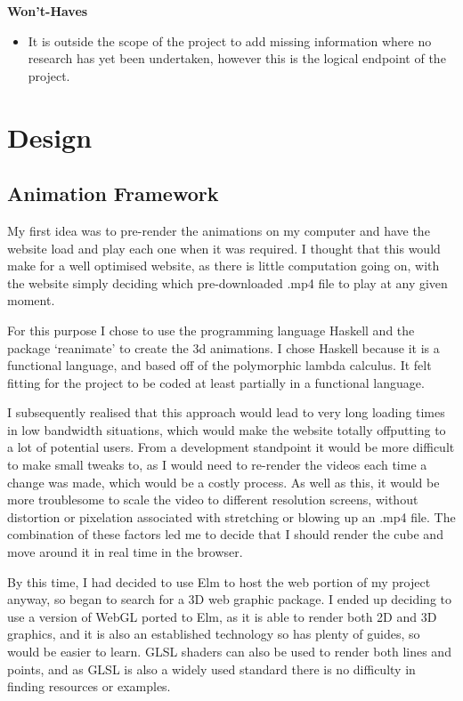 \documentclass{l4proj}
\begin{document}
\textbf{Won't-Haves}

\begin{itemize}
    \item It is outside the scope of the project to add missing information where no research has yet been undertaken, however this is the logical endpoint of the project.
\end{itemize}


\chapter{Design}

\section{Animation Framework}

My first idea was to pre-render the animations on my computer and have the website load and play each one when it was required.  I thought that this would make for a well optimised website, as there is little computation going on, with the website simply deciding which pre-downloaded .mp4 file to play at any given moment. 

For this purpose I chose to use the programming language Haskell and the package `reanimate' to create the 3d animations.  I chose Haskell because it is a functional language, and based off of the polymorphic lambda calculus.  It felt fitting for the project to be coded at least partially in a functional language.

I subsequently realised that this approach would lead to very long loading times in low bandwidth situations, which would make the website totally offputting to a lot of potential users.  From a development standpoint it would be more difficult to make small tweaks to, as I would need to re-render the videos each time a change was made, which would be a costly process.  As well as this, it would be more troublesome to scale the video to different resolution screens, without distortion or pixelation associated with stretching or blowing up an .mp4 file.  The combination of these factors led me to decide that I should render the cube and move around it in real time in the browser.

By this time, I had decided to use Elm to host the web portion of my project anyway, so began to search for a 3D web graphic package.  I ended up deciding to use a version of WebGL ported to Elm, as it is able to render both 2D and 3D graphics, and it is also an established technology so has plenty of guides, so would be easier to learn.  GLSL shaders can also be used to render both lines and points, and as GLSL is also a widely used standard there is no difficulty in finding resources or examples.
\end{document}
